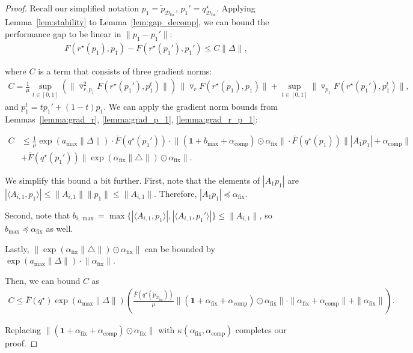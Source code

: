 \documentclass[table]{ai2style/ai2}
\newcommand{\Dfix}[0]{\mathcal{D}_{\text{fix}}}
\newcommand{\alphafix}[0]{\alpha_{\text{fix}}}
\newcommand{\alphacomp}[0]{\alpha_{\text{comp}}}
\begin{document}
\begin{proof}

Recall our simplified notation $p_1 = \tilde{p}_{\Dfix}$, $p_1' = q^\star_{\Dfix}$.
Applying Lemma~\ref{lem:stability} to Lemma~\ref{lem:gap_decomp}, we can bound the performance gap to be linear in $\| p_1 - p_1' \|$:
\begin{align*}
    F(r^\star(p_1),p_1)-F(r^\star(p_1'),p_1') \le C \|\Delta\|,
\end{align*}

where $C$ is a term that consists of three gradient norms:
\begin{align*}
        C = \frac{1}{\mu} \sup_{t\in[0,1]} \left( \|\triangledown^2_{r,p_1}F(r^\star(p_1'),p_1^t)\| \right) \,\|\triangledown_r F(r^\star(p_1),p_1)\| + \sup_{t\in[0,1]}\|\triangledown_{p_1}F(r^\star(p_1'),p_1^t)\|,
\end{align*}
and $p_1^t=t p_1'+(1-t)p_1$. We can apply the gradient norm bounds from Lemmas~\ref{lemma:grad_r}, \ref{lemma:grad_p_1}, \ref{lemma:grad_r_p_1}:

\begin{align*}
    C &\le \frac{1}{\mu} \exp( a_{\max} \| \Delta \| ) \cdot  \bar{F}(q^\star(p_1')) \cdot \big\| (\mathbf{1} + b_{\max} + \alphacomp) \odot \alphafix \big\| \cdot \bar{F}(q^\star(p_1))  \big\| | A_1 p_1 | + \alphacomp \big\| \\
    &+ \bar{F}(q^\star(p_1'))  \big\|  \exp( \alphafix \|\triangle \|) \odot \alphafix   \big\|.
\end{align*}

We simplify this bound a bit further. First, note that the elements of $|A_1 p_1|$ are $| \langle A_{i, 1}, p_1 \rangle| \le \|A_{i, 1}\| \| p_1\| \le \|A_{i, 1}\|$. Therefore, $|A_1 p_1| \preceq \alphafix$.

Second, note that $b_{i, \max} = \max\{ |\langle A_{i, 1}, p_1 \rangle|, |\langle A_{i, 1}, p_1' \rangle| \} \le \|A_{i, 1}\|$, so $b_{\max} \preceq \alphafix$ as well.

Lastly, $\big\|  \exp( \alphafix \|\triangle \|) \odot \alphafix   \big\| $ can be bounded by $\exp(a_{\max} \|\Delta\|) \cdot \big\|  \alphafix \big\| $.

Then, we can bound $C$ as
\begin{align*}
    C \le \bar{F}(q^\star) \exp(a_{\max} \| \Delta \|) \left( \frac{\bar{F}(q^\star(\tilde{p}_{\Dfix}))}{\mu} \|(\mathbf{1} + \alphafix + \alphacomp) \odot \alphafix \| \cdot \|\alphafix + \alphacomp \|  + \|\alphafix \| \right).
\end{align*}

Replacing $\|(\mathbf{1} + \alphafix + \alphacomp) \odot \alphafix \|$ with $\kappa(\alphafix, \alphacomp)$ completes our proof.

\end{proof}
\end{document}
